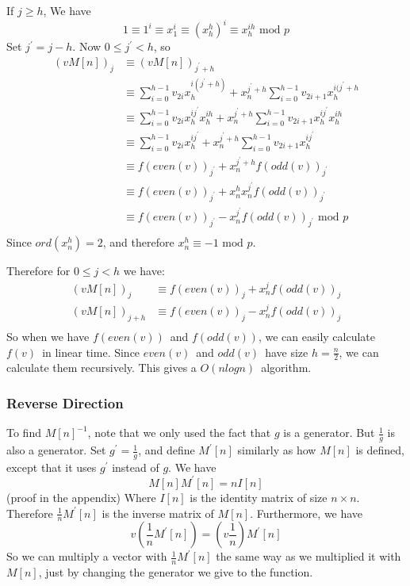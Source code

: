 \documentclass{article}
\begin{document}
If $j \geq h$, We have
\begin{equation*}
1 \equiv 1^{i} \equiv x_{1}^{i} \equiv \left(x_{h}^{h}\right)^{i} \equiv x_{h}^{ih} \text{ mod } p
\end{equation*}
Set $j^{'} = j - h$. Now $0 \leq j^{'} < h$, so
\begin{align*}
(vM[n])_{j}	&\equiv (vM[n])_{j^{'} + h}\\
		&\equiv \sum_{i=0}^{h-1} v_{2i} x_{h}^{i(j^{'} + h)} + x_{n}^{j^{'} + h} \sum_{i=0}^{h-1} v_{2i+1} x_{h}^{i(j^{'} + h}\\
		&\equiv \sum_{i=0}^{h-1} v_{2i} x_{h}^{ij^{'}} x_{h}^{ih} + x_{n}^{j^{'} + h} \sum_{i=0}^{h-1} v_{2i+1} x_{h}^{ij^{'}} x_{h}^{ih}\\
		&\equiv \sum_{i=0}^{h-1} v_{2i} x_{h}^{ij^{'}} + x_{n}^{j^{'} + h} \sum_{i=0}^{h-1} v_{2i+1} x_{h}^{ij^{'}}\\
		&\equiv f(even(v))_{j^{'}} + x_{n}^{j^{'} + h} f(odd(v))_{j^{'}}\\
		&\equiv f(even(v))_{j^{'}} + x_{n}^{h} x_{n}^{j^{'}} f(odd(v))_{j^{'}}\\
		&\equiv f(even(v))_{j^{'}} - x_{n}^{j^{'}} f(odd(v))_{j^{'}} \text{ mod } p\\
\end{align*}
Since $ord\left(x_{n}^{h}\right) = 2$, and therefore $x_{n}^{h} \equiv -1 \text { mod } p$.

Therefore for $0 \leq j < h$ we have:
\begin{align*}
(vM[n])_{j}	&\equiv f(even(v))_{j} + x_{n}^{j} f(odd(v))_{j}\\
(vM[n])_{j+h}	&\equiv f(even(v))_{j} - x_{n}^{j} f(odd(v))_{j}\\
\end{align*}
So when we have $f(even(v))$ and $f(odd(v))$, we can easily calculate $f(v)$ in linear time. Since $even(v)$ and $odd(v)$ have size $h = \frac{n}{2}$,
we can calculate them recursively. This gives a $O(n log n)$ algorithm.

\subsubsection{Reverse Direction}

To find $M[n]^{-1}$, note that we only used the fact that $g$ is a generator. But $\frac{1}{g}$ is also a generator.
Set $g^{'} = \frac{1}{g}$, and define $M^{'}[n]$ similarly as how $M[n]$ is defined, except that it uses $g^{'}$ instead of $g$.
We have
\begin{equation*}
M[n]M^{'}[n] = nI[n]
\end{equation*}
(proof in the appendix) Where $I[n]$ is the identity matrix of size $n \times n$. Therefore $\frac{1}{n} M^{'}[n]$ is the inverse matrix of $M[n]$.
Furthermore, we have
\begin{equation*}
v \left(\frac{1}{n} M^{'}[n]\right) = \left(v \frac{1}{n}\right) M^{'}[n]
\end{equation*}
So we can multiply a vector with $\frac{1}{n} M^{'}[n]$ the same way as we multiplied it with $M[n]$, just by changing the generator we give to the function.
\end{document}
